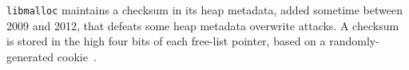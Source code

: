 
\texttt{libmalloc} maintains a checksum in its heap metadata, added
sometime between 2009 and 2012, that defeats some heap metadata
overwrite attacks. A checksum is stored in the high four bits of
each free-list pointer, based on a randomly-generated
cookie~\cite{ios-hackers-handbook-2012}.

